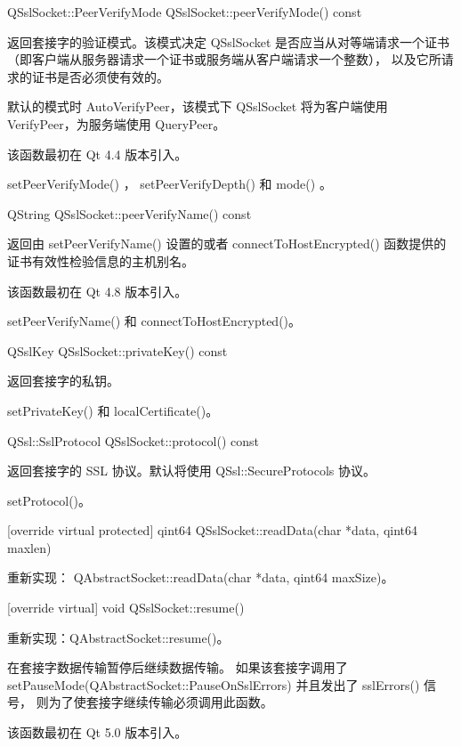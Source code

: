 QSslSocket::PeerVerifyMode QSslSocket::peerVerifyMode() const

返回套接字的验证模式。该模式决定 QSslSocket 是否应当从对等端请求一个证书（即客户端从服务器请求一个证书或服务端从客户端请求一个整数），
以及它所请求的证书是否必须使有效的。

默认的模式时 AutoVerifyPeer，该模式下 QSslSocket 将为客户端使用 VerifyPeer，为服务端使用 QueryPeer。

该函数最初在 Qt 4.4 版本引入。

\begin{notice}
setPeerVerifyMode() ， setPeerVerifyDepth() 和 mode() 。
\end{notice}

QString QSslSocket::peerVerifyName() const

返回由 setPeerVerifyName() 设置的或者 connectToHostEncrypted() 函数提供的证书有效性检验信息的主机别名。

该函数最初在 Qt 4.8 版本引入。

\begin{notice}
setPeerVerifyName() 和 connectToHostEncrypted()。
\end{notice}

QSslKey QSslSocket::privateKey() const

返回套接字的私钥。

\begin{notice}
setPrivateKey() 和 localCertificate()。
\end{notice}

QSsl::SslProtocol QSslSocket::protocol() const

返回套接字的 SSL 协议。默认将使用 QSsl::SecureProtocols 协议。

\begin{notice}
setProtocol()。
\end{notice}

[override virtual protected] qint64 QSslSocket::readData(char *data, qint64 maxlen)

重新实现： QAbstractSocket::readData(char *data, qint64 maxSize)。

[override virtual] void QSslSocket::resume()

重新实现：QAbstractSocket::resume()。

在套接字数据传输暂停后继续数据传输。
如果该套接字调用了 setPauseMode(QAbstractSocket::PauseOnSslErrors) 并且发出了 sslErrors() 信号，
则为了使套接字继续传输必须调用此函数。

该函数最初在 Qt 5.0 版本引入。

